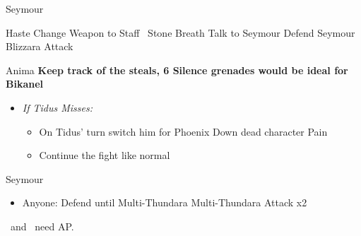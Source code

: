 \begin{battle}[3000]{Seymour}
    \begin{itemize}
        \tidusf Haste \tidus
        \yunaf Change Weapon to Staff
        \kimahrif \od\ Stone Breath
        \tidusf Talk to Seymour
        \switch{\yuna}{\auron}
        \auronf Defend
        \enemyf Seymour Blizzara
        \tidusf Attack
    \end{itemize}
\end{battle}
\begin{battle}[18000]{Anima}
    \textbf{Keep track of the steals, 6 Silence grenades would be ideal for Bikanel}
    \begin{itemize}
        \item \textit{If Tidus Misses:}
        \begin{itemize}
            \item On Tidus'  turn switch him for \lulu
            \luluf Phoenix Down dead character
            \enemyf Pain
            \item Continue the fight like normal
        \end{itemize}
    \end{itemize}
\end{battle}
\begin{battle}[6000]{Seymour}
    \begin{itemize}
        \tidusf Phoenix Down \rikku\ if she died before Multi-Thundara
        \item Anyone: Defend until Multi-Thundara
        \enemyf Multi-Thundara
        \tidusf Attack x2
    \end{itemize}
    \tidus\ and \yuna\ need AP.
\end{battle}
